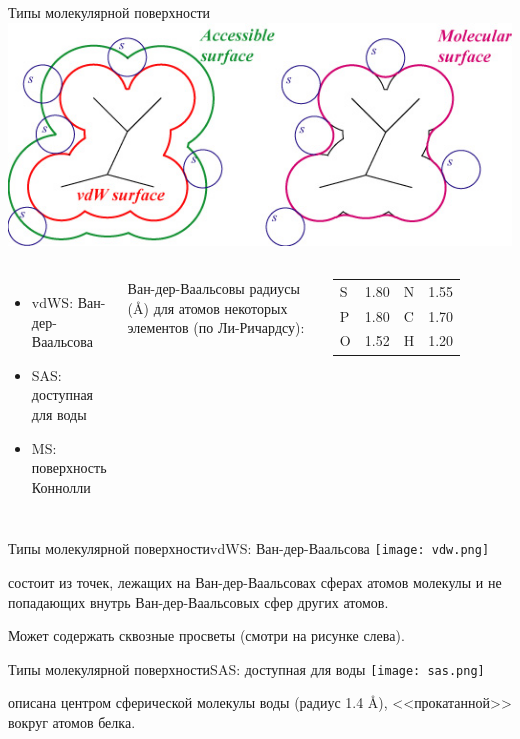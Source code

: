\documentclass{beamer}
\begin{document}
    \begin{frame}{Типы молекулярной поверхности}
        \includegraphics[width=\linewidth]{types.jpg}
        \begin{columns}[t]
            \begin{itemize}
            \item vdWS: Ван-дер-Ваальсова
            \item SAS: доступная для воды
            \item MS: поверхность Коннолли
            \end{itemize}
            \column{5cm}
            Ван-дер-Ваальсовы радиусы (\AA) для атомов
            некоторых элементов (по Ли-Ричардсу):

            \begin{tabular}{ l l | l l }
                S & 1.80 & N & 1.55 \\
                P & 1.80 & C & 1.70 \\
                O & 1.52 & H & 1.20 \\
            \end{tabular}
        \end{columns}
    \end{frame}

    \begin{frame}{Типы молекулярной поверхности}{vdWS: Ван-дер-Ваальсова}
        \texttt{[image: vdw.png]}

        состоит из точек, лежащих на Ван-дер-Ваальсовах сферах атомов молекулы и
        не попадающих внутрь Ван-дер-Ваальсовых сфер других атомов.

        Может содержать сквозные просветы (смотри на рисунке слева).
    \end{frame}

    \begin{frame}{Типы молекулярной поверхности}{SAS: доступная для воды}
        \texttt{[image: sas.png]}

        описана центром сферической молекулы воды (радиус 1.4 \AA),
        <<прокатанной>> вокруг атомов белка.


    \end{frame}
\end{document}
